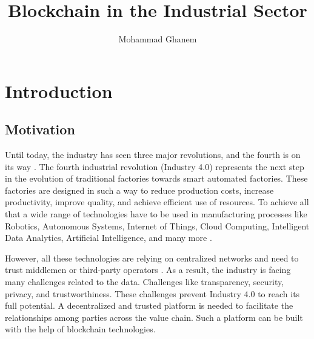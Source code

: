 \documentclass[runningheads]{llncs}
\begin{document}
\title{Blockchain in the Industrial Sector}
\author{Mohammad Ghanem}
\maketitle

\let\labelitemi\labelitemii

\section{Introduction}

\subsection{Motivation}
Until today, the industry has seen three major revolutions, and the fourth is on its way \cite{Rojko2017}. The fourth industrial revolution (Industry 4.0) represents the next step in the evolution of traditional factories towards smart automated factories. These factories are designed in such a way to reduce production costs, increase productivity, improve quality, and achieve efficient use of resources. To achieve all that a wide range of technologies have to be used in manufacturing processes like Robotics, Autonomous Systems, Internet of Things, Cloud Computing, Intelligent Data Analytics, Artificial Intelligence, and many more \cite{Fernandez-carames2018}.

\bigbreak

\noindent However, all these technologies are relying on centralized networks and need to trust middlemen or third-party operators \cite{Angrish2018a,Sikorski2017,Li2018,Afanasev2018,Garrocho2019}. As a result, the industry is facing many challenges related to the data. Challenges like transparency, security, privacy, and trustworthiness. These challenges prevent Industry 4.0 to reach its full potential. A decentralized and trusted platform is needed to facilitate the relationships among parties across the value chain. Such a platform can be built with the help of blockchain technologies.

\bigbreak
\end{document}
